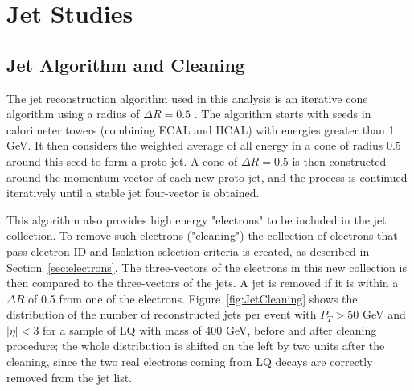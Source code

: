 %
\section{Jet Studies} \label{sec:jet}

\subsection{Jet Algorithm and Cleaning}

The jet reconstruction algorithm used in this analysis is an iterative cone algorithm using a radius of $\Delta R=0.5$ \cite{JetAlg}.  
The algorithm starts with seeds in calorimeter towers (combining ECAL and HCAL) with energies greater than 
1 GeV. It then considers the weighted average of all energy in a cone of radius 0.5 around this seed to form a proto-jet.  
A cone of $\Delta R = 0.5$ is then constructed around the momentum vector of each new proto-jet,  
and the process is continued iteratively until a stable jet four-vector is obtained.


This algorithm also provides high energy "electrons" to be included in the jet collection. 
To remove such electrons ("cleaning") the collection of electrons that pass electron ID and Isolation 
selection criteria is created, as described in Section~\ref{sec:electrons}. The three-vectors of the 
electrons in this new collection is then compared to the three-vectors of the jets. 
A jet is removed if it is within a $\Delta R$ of 0.5 from one of the electrons. 
Figure~\ref{fig:JetCleaning} shows the distribution of the number of reconstructed jets 
per event with $P_{T}>50$ GeV and $|\eta|<3$ for a sample of LQ with mass of 400 GeV, before and after cleaning procedure; 
the whole distribution is shifted on the left by two units after the cleaning, since the two real electrons 
coming from LQ decays are correctly removed from the jet list. 

